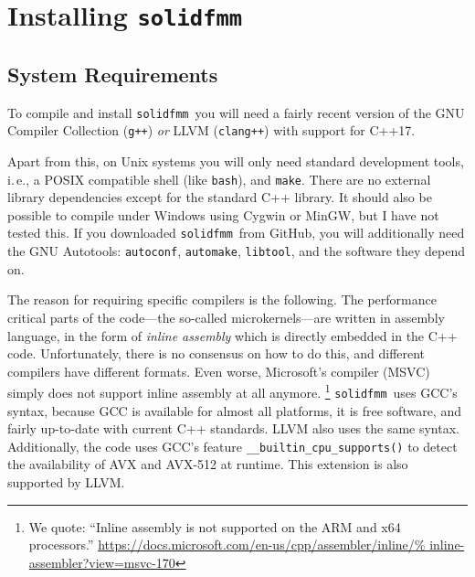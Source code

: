 \documentclass{scrbook}
\newcommand{\solidfmm}{\texttt{solidfmm}}
\begin{document}
\section{Installing \solidfmm}

\subsection{System Requirements}
To compile and install \solidfmm\ you will need a fairly recent version of the
GNU Compiler Collection (\lstinline|g++|) \emph{or} LLVM (\lstinline|clang++|)
with support for C++17. 

Apart from this, on Unix systems you will only need standard development tools,
i.\,e., a POSIX compatible shell (like \lstinline|bash|), and \lstinline|make|.
There are  no external library dependencies except for the standard C++ library.
It should also be possible to compile under Windows using Cygwin or MinGW, but I
have not tested this. If you downloaded \solidfmm\ from GitHub, you will
additionally need the GNU Autotools: \lstinline|autoconf|, \lstinline|automake|,
\lstinline|libtool|, and the software they depend on.

The reason for requiring specific compilers is the following. The performance
critical parts of the code---the so-called microkernels---are written in
assembly language, in the form of \emph{inline assembly} which is directly
embedded in the C++ code. Unfortunately, there is no consensus on how to do
this, and different compilers have different formats. Even worse, Microsoft's
compiler (MSVC) simply does not support inline assembly at all anymore.%
\footnote{We quote: \enquote{Inline assembly is not supported on the ARM and x64
processors.} \url{https://docs.microsoft.com/en-us/cpp/assembler/inline/%
inline-assembler?view=msvc-170}} \solidfmm\ uses GCC's syntax, because GCC is
available for almost all platforms, it is free software, and fairly up-to-date
with current C++ standards. LLVM also uses the same syntax. Additionally, the
code uses GCC's feature \lstinline|__builtin_cpu_supports()| to detect the
availability of AVX and AVX-512 at runtime. This extension is also supported by
LLVM. 
\end{document}
